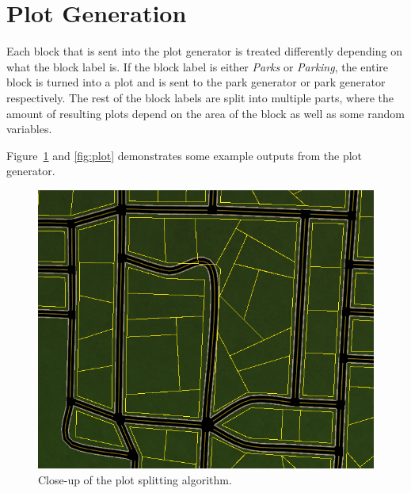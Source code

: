 \section{Plot Generation}
Each block that is sent into the plot generator is treated differently depending on what the block label is. 
If the block label is either \textit{Parks} or \textit{Parking}, the entire block is turned into a plot and is sent to the park generator or park generator respectively.
The rest of the block labels are split into multiple parts, where the amount of resulting plots depend on the area of the block as well as some random variables. 

Figure~\ref{fig:plot2} and \ref{fig:plot} demonstrates some example outputs from the plot generator.

\begin{figure}[H]
  \centering
  \begin{minipage}[b][][b]{.40\textwidth}
    \centering
    \begin{minipage}[b][][b]{.9\textwidth}
      \centering
      \includegraphics[width=\textwidth]{figure/plot2.png}
      \caption{Close-up of the plot splitting algorithm.}
      \label{fig:plot2}
    \end{minipage}
  \end{minipage}
  \begin{minipage}[b][][b]{.50\textwidth}
    \begin{minipage}[b][][b]{.9\textwidth}
      \centering

\end{minipage}
\end{minipage}
\end{figure}

